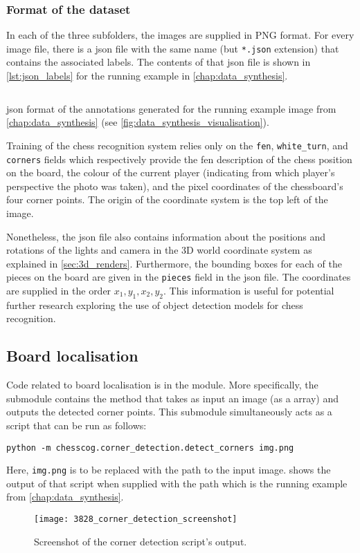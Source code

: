 \documentclass[../../report.tex]{subfiles}
\begin{document}
\subsubsection{Format of the dataset}
In each of the three subfolders, the images are supplied in PNG format.
For every image file, there is a \gls{json} file with the same name (but \texttt{*.json} extension) that contains the associated labels.
The contents of that \gls{json} file is shown in \cref{lst:json_labels} for the running example in \cref{chap:data_synthesis}.
\begin{listing}
    \inputminted{json}{\subfix{../../data/3828.json}}
    \caption[\acs{json} format of the annotations generated for the running example image from \cref{chap:data_synthesis}.]{\acs{json} format of the annotations generated for the running example image from \cref{chap:data_synthesis} (see \cref{fig:data_synthesis_visualisation}).}
    \label{fig:json_labels}
\end{listing}
Training of the chess recognition system relies only on the \texttt{fen}, \texttt{white\_turn}, and \texttt{corners} fields which respectively provide the \gls{fen} description of the chess position on the board, the colour of the current player (indicating from which player's perspective the photo was taken), and the pixel coordinates of the chessboard's four corner points.
The origin of the coordinate system is the top left of the image.

Nonetheless, the \gls{json} file also contains information about the positions and rotations of the lights and camera in the 3D world coordinate system as explained in \cref{sec:3d_renders}.
Furthermore, the bounding boxes for each of the pieces on the board are given in the \texttt{pieces} field in the \gls{json} file.
The coordinates are supplied in the order $x_1,y_1,x_2,y_2$.
This information is useful for potential further research exploring the use of object detection models for chess recognition.

\subsection{Board localisation}
Code related to board localisation is in the  module.
More specifically, the  submodule contains the  method that takes as input an image (as a  array) and outputs the detected corner points.
This submodule simultaneously acts as a script that can be run as follows:
\begin{verbatim}
python -m chesscog.corner_detection.detect_corners img.png
\end{verbatim}
Here, \texttt{img.png} is to be replaced with the path to the input image.
 shows the output of that script when supplied with the path  which is the running example from \cref{chap:data_synthesis}.
\begin{figure}
    \centering
    \texttt{[image: 3828\_corner\_detection\_screenshot]}
    \caption{Screenshot of the corner detection script's output.}
    \label{fig:example_detect_corners}
\end{figure}
\end{document}
